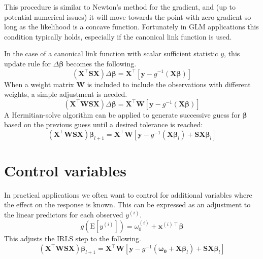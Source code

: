 \documentclass{article}
\newcommand{\bbeta}{\boldsymbol{\beta}}
\begin{document}
This procedure is similar to Newton's method for the gradient, and (up to
potential numerical issues) it will move towards the point with zero gradient so
long as the likelihood is a concave function. Fortunately in GLM applications
this condition typically holds, especially if the canonical link function is
used.

In the case of a canonical link function with scalar sufficient statistic
\(y\), this update rule for \(\Delta \bbeta\) becomes the
following.
\begin{equation}
\left( \mathbf{X}^\intercal \mathbf{S} \mathbf{X} \right) \Delta
\bbeta = \mathbf{X}^\intercal \left[ \mathbf{y} -
g^{-1}(\mathbf{X}\bbeta)\right]
\end{equation}
When a weight matrix \(\mathbf{W}\) is included to include the observations
with different weights, a simple adjustment is needed.
\begin{equation}
\left( \mathbf{X}^\intercal \mathbf{W} \mathbf{S} \mathbf{X} \right) \Delta
\bbeta = \mathbf{X}^\intercal \mathbf{W} \left[ \mathbf{y} -
g^{-1}(\mathbf{X}\bbeta)\right]
\end{equation}
A Hermitian-solve algorithm can be applied to generate successive guess for
\(\bbeta\) based on the previous guess until a desired tolerance
is reached:
\begin{equation}
\left( \mathbf{X}^\intercal \mathbf{W} \mathbf{S} \mathbf{X} \right)
\bbeta_{l+1} = \mathbf{X}^\intercal \mathbf{W} \left[ \mathbf{y} -
g^{-1}\left(\mathbf{X}\bbeta_l\right) + \mathbf{S} \mathbf{X}
\bbeta_l\right]
\end{equation}

\section{Control variables}

In practical applications we often want to control for additional variables
where the effect on the response is known. This can be expressed as an
adjustment to the linear predictors for each observed \(y^{(i)}\).
\[ g(\textrm{E}[y^{(i)}]) = \omega_0^{(i)} + \mathbf{x}^{(i)\intercal} \bbeta \]
This adjusts the IRLS step to the following.
\begin{equation}
\left( \mathbf{X}^\intercal \mathbf{W} \mathbf{S} \mathbf{X} \right)
\bbeta_{l+1} = \mathbf{X}^\intercal \mathbf{W} \left[ \mathbf{y} -
g^{-1}\left(\boldsymbol{\omega_0} + \mathbf{X}\bbeta_l\right) +
\mathbf{S} \mathbf{X} \bbeta_l\right]
\end{equation}
\end{document}
